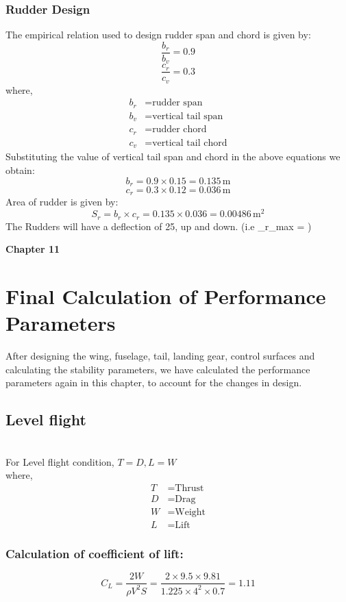\documentclass[12 pt]{article}
\begin{document}
{{\subsubsection{Rudder Design}
The empirical relation used to design rudder span and chord is given by:
\[
\frac{{b_r}}{{b_v}} = 0.9
\]
\[
\frac{{c_r}}{{c_v}} = 0.3
\]
where,
\begin{align*}
b_r & = \text{rudder span} \\
b_v & = \text{vertical tail span} \\
c_r & = \text{rudder chord} \\
c_v & = \text{vertical tail chord}
\end{align*}
Substituting the value of vertical tail span and chord in the above equations we obtain:
\[
b_r = 0.9 \times 0.15 = 0.135 \, \text{m}
\]
\[
c_r = 0.3 \times 0.12 = 0.036 \, \text{m}
\]
Area of rudder is given by:
\[
S_r = b_r \times c_r = 0.135 \times 0.036 = 0.00486 \, \text{m}^2
\]
The Rudders will have a deflection of 25\degree, up and down. (i.e \delta_{r_{max}} = \degree)

\vfill

\clearpage

\newpage
\textbf{\Huge{Chapter 11}}
\section{Final Calculation of Performance Parameters}
After designing the wing, fuselage, tail, landing gear, control surfaces and calculating the stability parameters, we have calculated the performance parameters again in this chapter, to account for the changes in design.

\subsection{Level flight} \\
For Level flight condition, $T=D , L=W$\\

where,
\begin{align*}
T & = \text{Thrust} \\
D & = \text{Drag} \\
W & = \text{Weight} \\
L & = \text{Lift}
\end{align*}

\subsubsection{Calculation of coefficient of lift:}
\[ C_L = \frac{2W}{\rho V^2 S} = \frac{2 \times 9.5 \times 9.81}{1.225 \times 4^2 \times 0.7} = 1.11 \]

}}
\end{document}
